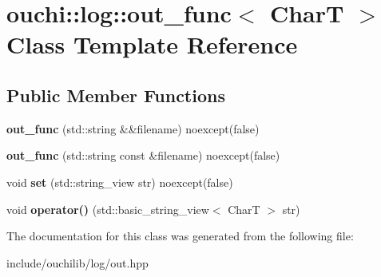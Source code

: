 \hypertarget{classouchi_1_1log_1_1out__func}{}\section{ouchi\+::log\+::out\+\_\+func$<$ CharT $>$ Class Template Reference}
\label{classouchi_1_1log_1_1out__func}
\subsection*{Public Member Functions}
\begin{DoxyCompactItemize}
\item 
\mbox{\label{classouchi_1_1log_1_1out__func_ab813dd2c566ff346d6acfcc3b26cd356}} 
{\bfseries out\+\_\+func} (std\+::string \&\&filename) noexcept(false)
\item 
\mbox{\label{classouchi_1_1log_1_1out__func_a0878c072e014a917c43cbe8cf194279d}} 
{\bfseries out\+\_\+func} (std\+::string const \&filename) noexcept(false)
\item 
\mbox{\label{classouchi_1_1log_1_1out__func_a834c90deaef38f59455c9f1073faa89a}} 
void {\bfseries set} (std\+::string\+\_\+view str) noexcept(false)
\item 
\mbox{\label{classouchi_1_1log_1_1out__func_abe13397068d9ab4ee48ab880ba65d61c}} 
void {\bfseries operator()} (std\+::basic\+\_\+string\+\_\+view$<$ CharT $>$ str)
\end{DoxyCompactItemize}


The documentation for this class was generated from the following file\+:\begin{DoxyCompactItemize}
\item 
include/ouchilib/log/out.\+hpp\end{DoxyCompactItemize}
